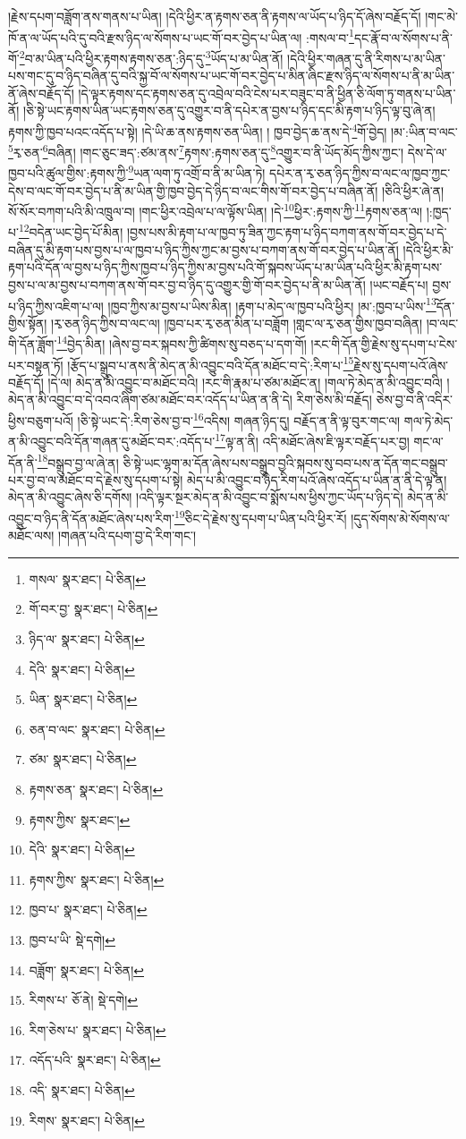 །རྗེས་དཔག་བཟློག་ནས་གནས་པ་ཡིན། །དེའི་ཕྱིར་ན་རྟགས་ཅན་ནི་རྟགས་ལ་ཡོད་པ་ཉིད་དོ་ཞེས་བརྗོད་དོ། །གང་མེ་ཁོ་ན་ལ་ཡོད་པའི་དུ་བའི་རྫས་ཉིད་ལ་སོགས་པ་ཡང་གོ་བར་བྱེད་པ་ཡིན་ལ། :གསལ་བ་\footnote{གསལ་  སྣར་ཐང་།  པེ་ཅིན། }དང་རྣོ་བ་ལ་སོགས་པ་ནི་གོ་\footnote{གོ་བར་བྱ་  སྣར་ཐང་།  པེ་ཅིན། }བ་མ་ཡིན་པའི་ཕྱིར་རྟགས་རྟགས་ཅན་:ཉིད་དུ་\footnote{ཉིད་ལ་  སྣར་ཐང་།  པེ་ཅིན། }ཡོད་པ་མ་ཡིན་ནོ། །དེའི་ཕྱིར་གཞན་དུ་ནི་རིགས་པ་མ་ཡིན་པས་གང་དུ་བ་ཉིད་བཞིན་དུ་བའི་སྐྱ་བོ་ལ་སོགས་པ་ཡང་གོ་བར་བྱེད་པ་མིན་ཞིང་རྫས་ཉིད་ལ་སོགས་པ་ནི་མ་ཡིན་ནོ་ཞེས་བརྗོད་དོ། །དེ་ལྟར་རྟགས་དང་རྟགས་ཅན་དུ་འབྲེལ་བའི་ངེས་པར་བཟུང་བ་ནི་ཕྱིན་ཅི་ལོག་ཏུ་གནས་པ་ཡིན་ནོ། །ཅི་སྟེ་ཡང་རྟགས་ཡིན་ཡང་རྟགས་ཅན་དུ་འགྱུར་བ་ནི་དཔེར་ན་བྱས་པ་ཉིད་དང་མི་རྟག་པ་ཉིད་ལྟ་བུ་ཞེ་ན། རྟགས་ཀྱི་ཁྱབ་པའང་འདོད་པ་སྟེ། །དེ་ཡི་ཆ་ནས་རྟགས་ཅན་ཡིན། །
ཁྱབ་བྱེད་ཆ་ནས་དེ་\footnote{དེའི་  སྣར་ཐང་།  པེ་ཅིན། }གོ་བྱེད། །མ་:ཡིན་བ་ལང་\footnote{ཡིན་  སྣར་ཐང་།  པེ་ཅིན། }རྭ་ཅན་\footnote{ཅན་བ་ལང་  སྣར་ཐང་།  པེ་ཅིན། }བཞིན། །གང་ཅུང་ཟད་:ཙམ་ནས་\footnote{ཙམ་  སྣར་ཐང་།  པེ་ཅིན། }རྟགས་:རྟགས་ཅན་དུ་\footnote{རྟགས་ཅན་  སྣར་ཐང་།  པེ་ཅིན། }འགྱུར་བ་ནི་ཡོད་མོད་ཀྱིས་ཀྱང་། དེས་དེ་ལ་ཁྱབ་པའི་ཚུལ་གྱིས་:རྟགས་ཀྱི་\footnote{རྟགས་ཀྱིས་  སྣར་ཐང་། }ཡན་ལག་ཏུ་འགྲོ་བ་ནི་མ་ཡིན་ཏེ། དཔེར་ན་རྭ་ཅན་ཉིད་ཀྱིས་བ་ལང་ལ་ཁྱབ་ཀྱང་དེས་བ་ལང་གོ་བར་བྱེད་པ་ནི་མ་ཡིན་གྱི་ཁྱབ་བྱེད་དེ་ཉིད་བ་ལང་གིས་གོ་བར་བྱེད་པ་བཞིན་ནོ། །ཅིའི་ཕྱིར་ཞེ་ན། སོ་སོར་བཀག་པའི་མི་འཁྲུལ་བ། །གང་ཕྱིར་འབྲེལ་པ་ལ་ལྟོས་ཡིན། །དེ་\footnote{དེའི་  སྣར་ཐང་།  པེ་ཅིན། }ཕྱིར་:རྟགས་ཀྱི་\footnote{རྟགས་ཀྱིས་  སྣར་ཐང་།  པེ་ཅིན། }རྟགས་ཅན་ལ། །:ཁྱད་པ་\footnote{ཁྱབ་པ་  སྣར་ཐང་།  པེ་ཅིན། }བདེན་ཡང་བྱེད་པོ་མིན། །བྱས་པས་མི་རྟག་པ་ལ་ཁྱབ་ཏུ་ཟིན་ཀྱང་རྟག་པ་ཉིད་བཀག་ནས་གོ་བར་བྱེད་པ་དེ་བཞིན་དུ་མི་རྟག་པས་བྱས་པ་ལ་ཁྱབ་པ་ཉིད་ཀྱིས་ཀྱང་མ་བྱས་པ་བཀག་ནས་གོ་བར་བྱེད་པ་ཡིན་ནོ། །དེའི་ཕྱིར་མི་རྟག་པའི་དོན་ལ་བྱས་པ་ཉིད་ཀྱིས་ཁྱབ་པ་ཉིད་ཀྱིས་མ་བྱས་པའི་གོ་སྐབས་ཡོད་པ་མ་ཡིན་པའི་ཕྱིར་མི་རྟག་པས་བྱས་པ་ལ་མ་བྱས་པ་བཀག་ནས་གོ་བར་བྱ་བ་ཉིད་དུ་འགྱུར་གྱི་གོ་བར་བྱེད་པ་ནི་མ་ཡིན་ནོ། །ཡང་བརྗོད་པ། བྱས་པ་ཉིད་ཀྱིས་འཇིག་པ་ལ། །ཁྱབ་ཀྱིས་མ་བྱས་པ་ཡིས་མིན། །རྟག་པ་མེད་ལ་ཁྱབ་པའི་ཕྱིར། །མ་:ཁྱབ་པ་ཡིས་\footnote{ཁྱབ་པ་ཡི་  སྡེ་དགེ། }དོན་གྱིས་སྟོན། །རྭ་ཅན་ཉིད་ཀྱིས་བ་ལང་ལ། །ཁྱབ་པར་རྭ་ཅན་མིན་པ་བཟློག །གླང་ལ་རྭ་ཅན་གྱིས་ཁྱབ་བཞིན། །བ་ལང་གི་དོན་ཟློག་\footnote{བཟློག་  སྣར་ཐང་།  པེ་ཅིན། }བྱེད་མིན། །ཞེས་བྱ་བར་སྐབས་ཀྱི་ཚིགས་སུ་བཅད་པ་དག་གོ། །རང་གི་དོན་གྱི་རྗེས་སུ་དཔག་པ་ངེས་པར་བསྟན་ཏོ། །རྩོད་པ་སྒྲུབ་པ་ནས་ནི་མེད་ན་མི་འབྱུང་བའི་དོན་མཐོང་བ་དེ་:རིག་པ་\footnote{རིགས་པ་  ཅོ་ནེ།  སྡེ་དགེ། }རྗེས་སུ་དཔག་པའོ་ཞེས་བརྗོད་དོ། །དེ་ལ། མེད་ན་མི་འབྱུང་བ་མཐོང་བའི། །རང་གི་རྣམ་པ་ཙམ་མཐོང་ན། །གལ་ཏེ་མེད་ན་མི་འབྱུང་བའི། །མེད་ན་མི་འབྱུང་བ་དེ་འབའ་ཞིག་ཙམ་མཐོང་བར་འདོད་པ་ཡིན་ན་ནི་དེ། རིག་ཅེས་མི་བརྗོད། ཅེས་བྱ་བ་ནི་འདིར་ཕྱིས་བཅུག་པའོ། །ཅི་སྟེ་ཡང་དེ་:རིག་ཅེས་བྱ་བ་\footnote{རིག་ཅེས་པ་  སྣར་ཐང་།  པེ་ཅིན། }འདིས། གཞན་ཉིད་དུ། བརྗོད་ན་ནི་ལྟ་བུར་གང་ལ། གལ་ཏེ་མེད་ན་མི་འབྱུང་བའི་དོན་གཞན་དུ་མཐོང་བར་:འདོད་པ་\footnote{འདོད་པའི་  སྣར་ཐང་།  པེ་ཅིན། }ལྟ་ན་ནི། འདི་མཐོང་ཞེས་ཇི་ལྟར་བརྗོད་པར་བྱ། གང་ལ་དོན་ནི་\footnote{འདི་  སྣར་ཐང་།  པེ་ཅིན། }བསྒྲུབ་བྱ་ལ་ཞེ་ན། ཅི་སྟེ་ཡང་ལྷག་མ་དོན་ཞེས་པས་བསྒྲུབ་བྱའི་སྐབས་སུ་བབ་པས་ན་དོན་གང་བསྒྲུབ་པར་བྱ་བ་ལ་མཐོང་བ་དེ་རྗེས་སུ་དཔག་པ་སྟེ། མེད་པ་མི་འབྱུང་བ་ཉིད་རིག་པའོ་ཞེས་འདོད་པ་ཡིན་ན་ནི་དེ་ལྟ་ན། མེད་ན་མི་འབྱུང་ཞེས་ཅི་དགོས། །འདི་ལྟར་སྔར་མེད་ན་མི་འབྱུང་བ་སྨོས་པས་ཕྱིས་ཀྱང་ཡོད་པ་ཉིད་དེ། མེད་ན་མི་འབྱུང་བ་ཉིད་ནི་དོན་མཐོང་ཞེས་པས་རིག་\footnote{རིགས་  སྣར་ཐང་།  པེ་ཅིན། }ཅིང་དེ་རྗེས་སུ་དཔག་པ་ཡིན་པའི་ཕྱིར་རོ། །དུད་སོགས་མེ་སོགས་ལ་མཐོང་ལས། །གཞན་པའི་དཔག་བྱ་དེ་རིག་གང་། 